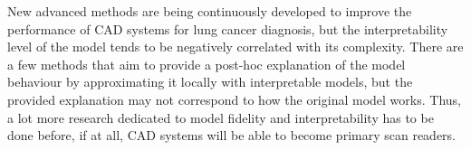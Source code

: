 \documentclass[12pt]{article}
\providecommand\phantomsection{}
\begin{document}
New advanced methods are being continuously developed to improve the performance of CAD systems for lung cancer diagnosis, but the interpretability level of the model tends to be negatively correlated with its complexity. There are a few methods that aim to provide a post-hoc explanation of the model behaviour by approximating it locally with interpretable models, but the provided explanation may not correspond to how the original model works. Thus, a lot more research dedicated to model fidelity and interpretability has to be done before, if at all, CAD systems will be able to become primary scan readers.

\cleardoublepage

\phantomsection


\end{document}
